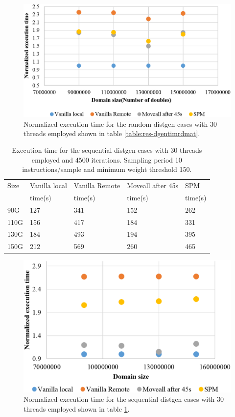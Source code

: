 \begin{figure}[th]
	\centering
		\includegraphics[width=.8\textwidth]{figures/time-dgenat-random.eps}
		\caption{Normalized execution time for the random distgen cases with 30 threads employed shown in table \ref{table:res-dgentimrdmat}.}
		\label{fig:res-dgentimrdmat}
\end{figure}


\begin{table}[th]
	\centering
		\begin{tabularx}{.9\textwidth}{|l|l|l|l|X|}
		\hline
			Size & Vanilla local & Vanilla Remote & Moveall after 45s & SPM \\
			& time(s) & time(s) & time(s) & time(s)  \\
			\hline
			90G & 127 & 341 & 152 & 262\\
			\hline
			110G & 156 & 417& 184 & 331\\
			\hline
			130G & 184 & 493 & 194 & 395\\
			\hline
			150G & 212 & 569 & 260 & 465\\
			\hline
		\end{tabularx}
		\caption{Execution time for the sequential distgen cases with 30 threads employed and 4500 iterations. Sampling period 10 instructions/sample and minimum weight threshold 150.}
		\label{table:res-dgentimserat}
\end{table}

\begin{figure}[th]
	\centering
		\includegraphics[width=.8\textwidth]{figures/time-dgenatt-ser.eps}
		\caption{Normalized execution time for the sequential distgen cases with 30 threads employed shown in table \ref{table:res-dgentimserat}.}
		\label{fig:time-dgenatt-ser}
\end{figure}

